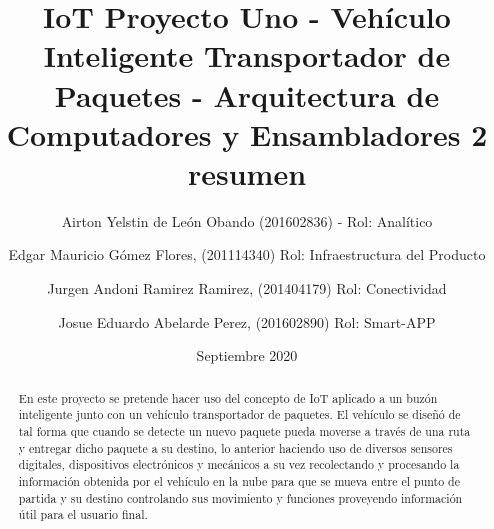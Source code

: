\documentclass[osajnl,twocolumn,showpacs,superscriptaddress,10pt]{revtex4-1}
\begin{document}

\title{\Huge IoT Proyecto Uno -  Vehículo Inteligente Transportador de Paquetes  - Arquitectura de Computadores y Ensambladores 2 }

\author{\newline Airton Yelstin de León Obando (201602836) - Rol: Analítico}
%

\author{\newline Edgar Mauricio Gómez Flores, (201114340) Rol: Infraestructura del Producto}%
%
\author{\newline Jurgen Andoni Ramirez Ramirez, (201404179) Rol: Conectividad}%
%
\author{\newline Josue Eduardo Abelarde Perez, (201602890) Rol: Smart-APP}%
%
\author{\newline}
\date{Septiembre 2020}



\begin{abstract}
\title {resumen}
En este proyecto se pretende hacer uso del concepto de IoT aplicado a un buzón inteligente junto con un vehículo transportador de paquetes. El vehículo se diseñó de tal forma que cuando se detecte un nuevo paquete pueda moverse a través de una ruta y entregar dicho paquete a su destino, lo anterior haciendo uso de diversos sensores digitales, dispositivos electrónicos y mecánicos a su vez recolectando y procesando la información obtenida por el vehículo en la nube para que se mueva entre el punto de partida y su destino controlando sus movimiento y funciones proveyendo información útil para el usuario final.
\end{abstract}
\maketitle{}
\end{document}
